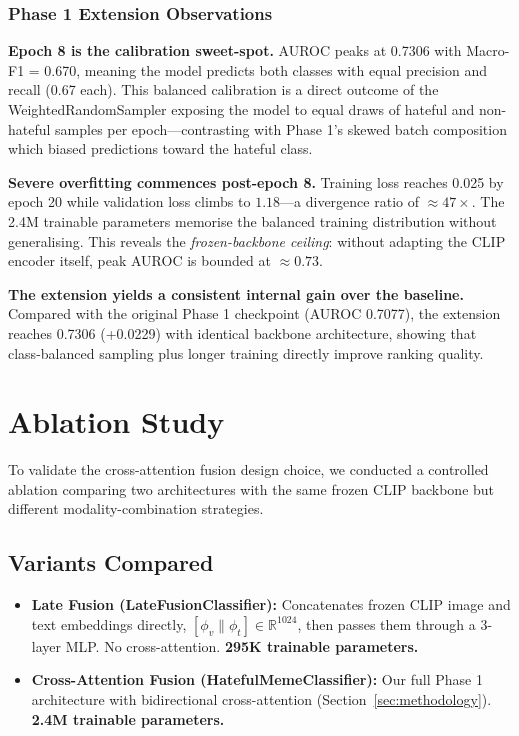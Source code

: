 \documentclass[12pt,a4paper]{article}
\begin{document}
\subsubsection{Phase 1 Extension Observations}

\textbf{Epoch 8 is the calibration sweet-spot.} AUROC peaks at 0.7306 with Macro-F1 = 0.670, meaning the model predicts both classes with equal precision and recall (0.67 each). This balanced calibration is a direct outcome of the WeightedRandomSampler exposing the model to equal draws of hateful and non-hateful samples per epoch---contrasting with Phase 1's skewed batch composition which biased predictions toward the hateful class.

\textbf{Severe overfitting commences post-epoch 8.} Training loss reaches 0.025 by epoch 20 while validation loss climbs to $1.18$---a divergence ratio of $\approx\!47{\times}$. The 2.4M trainable parameters memorise the balanced training distribution without generalising. This reveals the \textit{frozen-backbone ceiling}: without adapting the CLIP encoder itself, peak AUROC is bounded at $\approx\!0.73$.

\textbf{The extension yields a consistent internal gain over the baseline.} Compared with the original Phase 1 checkpoint (AUROC 0.7077), the extension reaches 0.7306 (+0.0229) with identical backbone architecture, showing that class-balanced sampling plus longer training directly improve ranking quality.

\section{Ablation Study}

To validate the cross-attention fusion design choice, we conducted a controlled ablation comparing two architectures with the same frozen CLIP backbone but different modality-combination strategies.

\subsection{Variants Compared}

\begin{itemize}
  \item \textbf{Late Fusion (LateFusionClassifier):} Concatenates frozen CLIP image and text embeddings directly, $[\phi_v \| \phi_t] \in \mathbb{R}^{1024}$, then passes them through a 3-layer MLP. No cross-attention. \textbf{295K trainable parameters.}
  \item \textbf{Cross-Attention Fusion (HatefulMemeClassifier):} Our full Phase 1 architecture with bidirectional cross-attention (Section~\ref{sec:methodology}). \textbf{2.4M trainable parameters.}
\end{itemize}
\end{document}
